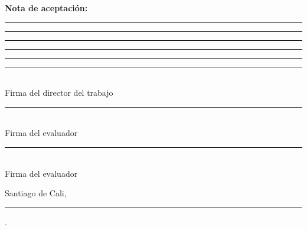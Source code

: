 \documentclass[12pt]{report}
\begin{document}

\newpage
\thispagestyle{empty}

\noindent\textbf{Nota de aceptación:}

\vspace{3cm}

\rule{\textwidth}{0.4pt}

\vspace{0.8cm}

\rule{\textwidth}{0.4pt}

\vspace{0.8cm}

\rule{\textwidth}{0.4pt}

\vspace{0.8cm}

\rule{\textwidth}{0.4pt}

\vspace{0.8cm}

\rule{\textwidth}{0.4pt}

\vspace{3cm}

\noindent\begin{minipage}[t]{0.45\textwidth}
    \centering
    \rule{6cm}{0.4pt}\\
    Firma del director del trabajo
\end{minipage}
\hfill
\begin{minipage}[t]{0.45\textwidth}
    \centering
    \rule{6cm}{0.4pt}\\
    Firma del evaluador
\end{minipage}

\vspace{3cm}

\noindent\centering
\rule{6cm}{0.4pt}\\
Firma del evaluador

\vfill

\noindent Santiago de Cali, \rule{3cm}{0.4pt}.

\end{document}
